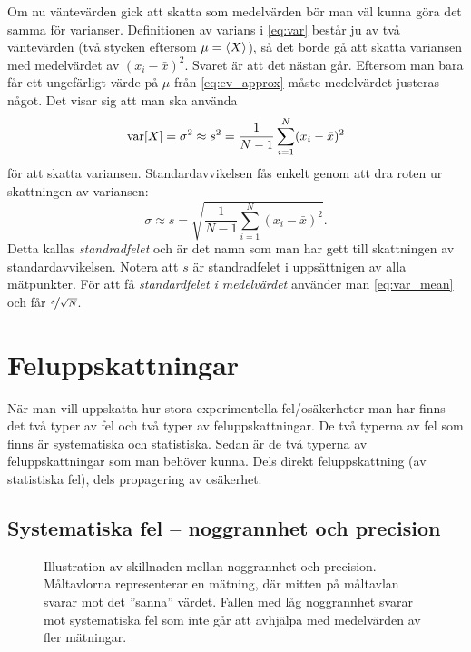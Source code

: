 \documentclass[11pt,a4paper, english, swedish
]{article}
\newcommand{\VAR}[1]{\ensuremath\text{var}\!\left[#1\right]}
\begin{document}
Om nu väntevärden gick att skatta som medelvärden bör man väl kunna
göra det samma för varianser. Definitionen av varians i \eqref{eq:var}
består ju av två väntevärden (två stycken eftersom $\mu=\ev{X}$), så
det borde gå att skatta variansen med medelvärdet av
$(x_i-\bar{x})^2$. Svaret är att det  nästan går. Eftersom man bara
får ett ungefärligt värde på $\mu$ från \eqref{eq:ev_approx} måste
medelvärdet justeras något. Det visar sig att man ska använda
\begin{equation}\label{eq:var_approx}
\VAR{X} = \sigma^2 \approx s^2 = \frac{1}{N-1}\sum_{i=1}^N (x_i-\bar{x})^2
\end{equation}
för att skatta variansen. Standardavvikelsen fås enkelt genom att dra
roten ur skattningen av variansen:
\begin{equation}\label{eq:std_approx}
\sigma \approx s = \sqrt{\frac{1}{N-1}\sum_{i=1}^N (x_i-\bar{x})^2}.
\end{equation}
Detta kallas \emph{standradfelet} och är det namn som man har gett
till skattningen av standardavvikelsen.
Notera att $s$ är standradfelet i uppsättnigen av alla
mätpunkter. För att få \emph{standardfelet i medelvärdet}
använder man \eqref{eq:var_mean} och får $\nicefrac{s}{\sqrt{N}}$.




\section{Feluppskattningar}\label{sec:feluppskattningar}
När man vill uppskatta hur stora experimentella fel/osäkerheter man
har finns det två typer av fel och två typer av feluppskattningar. De
två typerna av fel som finns är systematiska och statistiska. Sedan är
de två typerna av feluppskattningar som man behöver kunna. Dels direkt
feluppskattning (av statistiska fel), dels propagering av osäkerhet. 


\subsection{Systematiska fel -- noggrannhet och precision}
\begin{figure}
\centering
\resizebox{0.5\textwidth}{!}{

}
\caption{Illustration av skillnaden mellan noggrannhet och
  precision. Måltavlorna representerar en mätning, där mitten på
  måltavlan svarar mot det ''sanna'' värdet. Fallen med låg
  noggrannhet svarar mot systematiska fel som inte går att avhjälpa
  med medelvärden av fler mätningar.}
\label{fig:prec_nog}
\end{figure}
\end{document}
